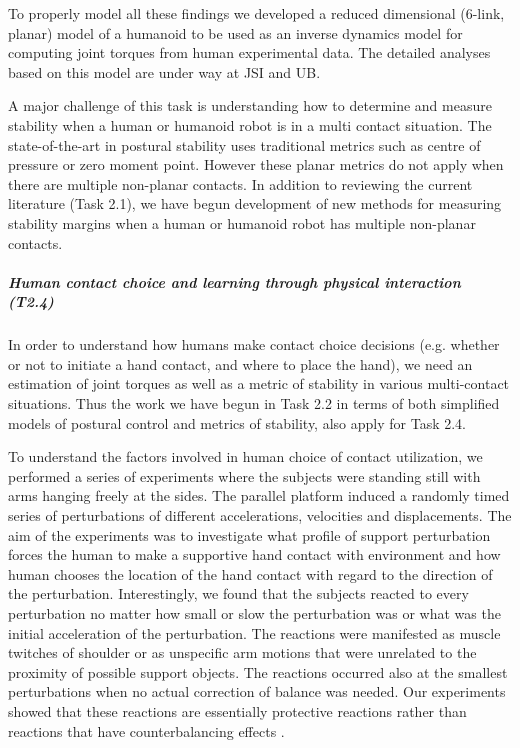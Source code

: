 \documentclass[12pt,a4paper,twoside]{article}
\begin{document}
To properly model all these findings we developed a reduced dimensional (6-link, planar) model of a humanoid to be used as an inverse dynamics model for computing joint torques from human experimental data. The detailed analyses based on this model are under way at JSI and UB.

A major challenge of this task is understanding how to determine and measure stability when a human or humanoid robot is in a multi contact situation. The state-of-the-art in postural stability uses traditional metrics such as centre of pressure or zero moment point. However these planar metrics do not apply when there are multiple non-planar contacts. In addition to reviewing the current literature (Task 2.1), we have begun development of new methods for measuring stability margins when a human or humanoid robot has multiple non-planar contacts.

\subparagraph{Human contact choice and learning through physical interaction (T2.4)}

In order to understand how humans make contact choice decisions (e.g. whether or not to initiate a hand contact, and where to place the hand), we need an estimation of joint torques as well as a metric of stability in various multi-contact situations. Thus the work we have begun in Task 2.2 in terms of both simplified models of postural control and metrics of stability, also apply for Task 2.4.

To understand the factors involved in human choice of contact utilization, we performed a series of experiments where the subjects were standing still with arms hanging freely at the sides. The parallel platform induced a randomly timed series of perturbations of different accelerations, velocities and displacements. The aim of the experiments was to investigate what profile of support perturbation forces the human to make a supportive hand contact with environment and how human chooses the location of the hand contact with regard to the direction of the perturbation. Interestingly, we found that the subjects reacted to every perturbation no matter how small or slow the perturbation was or what was the initial acceleration of the perturbation. The reactions were manifested as muscle twitches of shoulder or as unspecific arm motions that were unrelated to the proximity of possible support objects. The reactions occurred also at the smallest perturbations when no actual correction of balance was needed. Our experiments showed that these reactions are essentially protective reactions rather than reactions that have counterbalancing effects \cite{McIlroy1995, Corbeil2013}.
\end{document}
